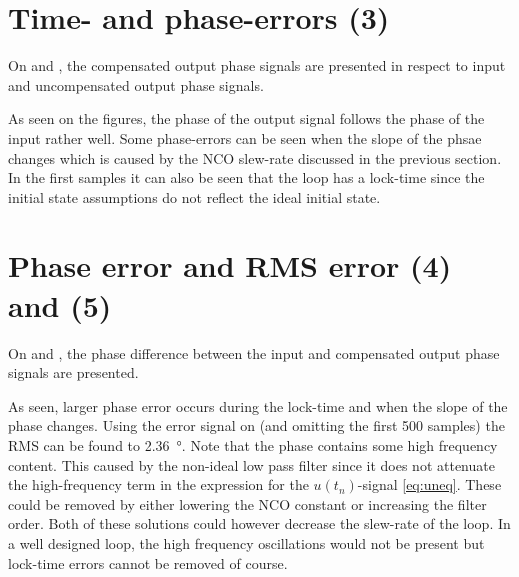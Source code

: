 \section{Time- and phase-errors (3)}
On  and , the compensated output phase signals are presented in respect to input and uncompensated output phase signals.


As seen on the figures, the phase of the output signal follows the phase of the input rather well. Some phase-errors can be seen when the slope of the phsae changes which is caused by the NCO slew-rate discussed in the previous section. In the first samples it can also be seen that the loop has a lock-time since the initial state assumptions do not reflect the ideal initial state.

\section{Phase error and RMS error (4) and (5)}
On  and , the phase difference between the input and compensated output phase signals are presented.


As seen, larger phase error occurs during the lock-time and when the slope of the phase changes. Using the error signal on  (and omitting the first 500 samples) the RMS can be found to \SI{2.36}{\degree}. Note that the phase contains some high frequency content. This caused by the non-ideal low pass filter since it does not attenuate the high-frequency term in the expression for the $u(t_n)$-signal \eqref{eq:uneq}. These could be removed by either lowering the NCO constant or increasing the filter order. Both of these solutions could however decrease the slew-rate of the loop. In a well designed loop, the high frequency oscillations would not be present but lock-time errors cannot be removed of course.

